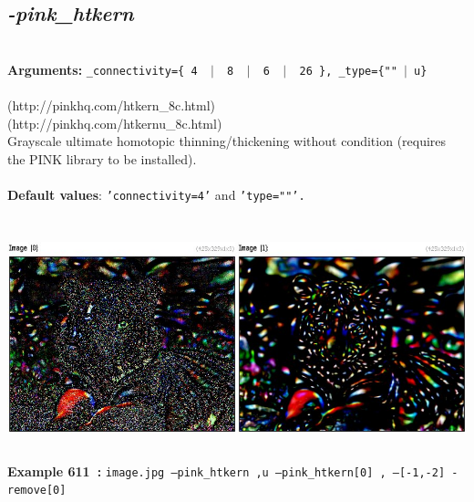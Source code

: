 \documentclass[a4paper,11pt,twoside]{book}
\begin{document}
\subsection{\emph{-pink\_htkern} }\vspace*{-0.5em}
~\\\textbf{Arguments: } 
{\small \texttt{\_connectivity=\{ 4 ~$|$~ 8 ~$|$~ 6 ~$|$~ 26 \}, \_type=\{""~$|$~u\}}}\\~\\
(http://pinkhq.com/htkern\_8c.html)
~\\(http://pinkhq.com/htkernu\_8c.html)
~\\Grayscale ultimate homotopic thinning/thickening without condition (requires the PINK library to be installed).
~\\~\\\textbf{Default values}: {\small \texttt{'connectivity=4'} and \texttt{'type=""'.}}
\begin{center}\includegraphics[keepaspectratio=true,height=7cm,width=\textwidth]{img/gmic_def611.jpg}\\
{\footnotesize \textbf{Example 611~:} \texttt{image.jpg --pink\_htkern ,u --pink\_htkern[0] , ---[-1,-2] -remove[0]}}
\end{center}
\end{document}
